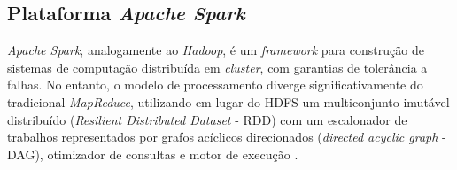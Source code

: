 



\subsection{Plataforma \emph{Apache Spark}}

\emph{Apache Spark}, analogamente ao \emph{Hadoop}, é um \emph{framework} para
construção de sistemas de computação distribuída em \emph{cluster}, com garantias
de tolerância a falhas.
No entanto, o modelo de processamento diverge
significativamente do tradicional \emph{MapReduce}, utilizando em lugar do HDFS
um multiconjunto imutável distribuído (\emph{Resilient Distributed Dataset}
- RDD) com um escalonador de trabalhos representados por grafos acíclicos
direcionados (\emph{directed acyclic graph} - DAG), otimizador de consultas e
motor de execução \cite{ApacheSpark2020}.


